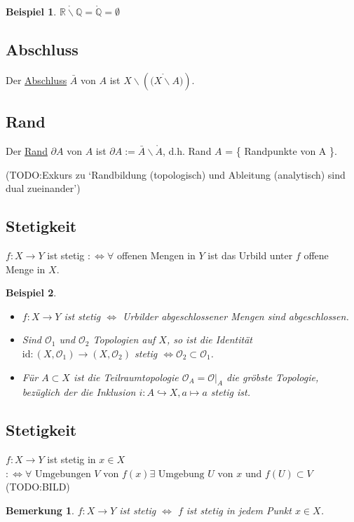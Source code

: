 \documentclass[a4paper,11pt,notitlepage]{report}
\newtheorem{remark}{Bemerkung}[chapter]
\newtheorem{example}{Beispiel}[chapter]
\newcommand{\R}{{\ensuremath{\mathbb{R}}}}
\newcommand{\Q}{{\ensuremath{\mathbb{Q}}}}
\newcommand{\OO}{{\ensuremath{\mathcal{O}}}}
\newenvironment{Kasten}[1]
{
\hspace{0.05\linewidth}
\begin{center}
\begin{minipage}{0.9\linewidth}
\setlength{\fboxsep}{10pt}
\definecolor{shadecolor}{gray}{1}
\definecolor{framecolor}{gray}{0}
\def\FrameCommand{\fcolorbox{framecolor}{shadecolor}}
\MakeFramed {\FrameRestore}
\subsection{#1}
\begin{itshape}
}
{
\end{itshape}
\endMakeFramed
\end{minipage}
\end{center}
}
\begin{document}
\begin{example}
	$\mathring {\R \backslash \Q} = \mathring \Q = \emptyset$
\end{example}

\begin{Kasten}{Abschluss}
	Der \underline{Abschluss} $\bar{A}$ von $A$ ist $X \backslash \left ( \mathring {(X \backslash A} ) \right )$.
\end{Kasten}

\begin{Kasten}{Rand}
	Der \underline{Rand} $\partial A$ von $A$ ist $\partial A := \bar{A} \backslash \mathring A$, d.h. Rand $A$ = \{ Randpunkte von A \}.
\end{Kasten}

(TODO:Exkurs zu `Randbildung (topologisch) und Ableitung (analytisch) sind dual zueinander')

\begin{Kasten}{Stetigkeit}
	$f \colon X \rightarrow Y$ ist stetig $:\Leftrightarrow \forall$ offenen Mengen in $Y$ ist das Urbild unter $f$ offene Menge in $X$.
\end{Kasten}

\begin{example}
	\begin{itemize}
		\item $f \colon X \rightarrow Y$ ist stetig $\Leftrightarrow$ Urbilder abgeschlossener Mengen sind abgeschlossen.
		\item Sind $\OO_1$ und $\OO_2$ Topologien auf $X$, so ist die Identität $\text{id} \colon (X,\OO_1) \rightarrow (X,\OO_2)$ stetig $\Leftrightarrow \OO_2 \subset \OO_1$.
		\item Für $A \subset X$ ist die Teilraumtopologie $\OO_A = \OO \big |_A$ die gröbste Topologie, bezüglich der die Inklusion $i \colon A \hookrightarrow X, a \mapsto a$ stetig ist.
	\end{itemize}
\end{example}

\begin{Kasten}{Stetigkeit} %
	$f \colon X \rightarrow Y$ ist stetig in $x \in X$
	$:\Leftrightarrow \forall \text{ Umgebungen } V \text{ von } f(x) \exists \text{ Umgebung } U \text{ von } x \text{ und } f(U) \subset V$
	\newline
	(TODO:BILD)
\end{Kasten}

\begin{remark}
	$f \colon X \rightarrow Y$ ist stetig $\Leftrightarrow$ $f$ ist stetig in jedem Punkt $x \in X$.
\end{remark}
\end{document}
